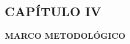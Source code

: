 \begin{center}
    \section*{CAPÍTULO IV}
    \vspace*{0.5in}
    \textbf{MARCO METODOLÓGICO}
\end{center}

\newpage